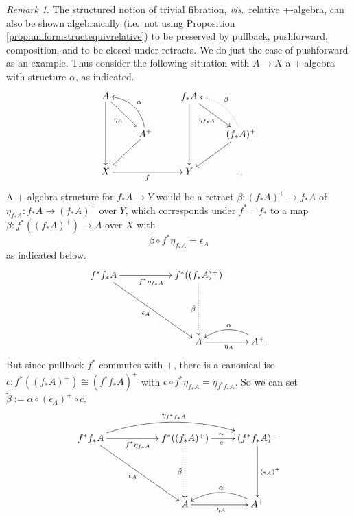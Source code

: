 \documentclass[11pt]{amsart}
\renewcommand{\to}{\ensuremath{\rightarrow}}
\theoremstyle{remark}
\newtheorem{remark}[theorem]{Remark}
\theoremstyle{definition}
\begin{document}
\begin{remark}\label{trivfibpushforward}
The structured notion of trivial fibration, \emph{vis}.\ relative +-algebra, can also be shown algebraically (i.e.\ not using Proposition \ref{prop:uniformstructequivrelative}) to be preserved by pullback, pushforward, composition, and to be closed under retracts. We do just the case of pushforward as an example.   
Thus consider the following situation with $A\to X$ a +-algebra with structure $\alpha$, as indicated.
\begin{equation}\label{diagram:pushforwardplusalgebras}
\xymatrix{
A \ar[rd]_{\eta_A} \ar[dd]  && f_*A \ar[rd]_{\eta_{f_*A}} \ar[dd] & \\
& A^+ \ar[ld] \ar@/_3ex/ [ul]_\alpha && (f_*A)^+ \ar[ld]  \ar@{.>}@/_3ex/ [ul]_\beta \\
X \ar[rr]_{f} && Y &,
}
\end{equation}
A +-algebra structure for $f_*A \to Y$ would be a retract $\beta : (f_*A)^+ \to f_*A$ of $\eta_{f_*A} : f_*A \to (f_*A)^+$ over $Y$, which corresponds under $f^*\dashv f_*$ to a map $\tilde\beta : f^*((f_*A)^+) \to A$ over $X$ with $$\tilde\beta \circ f^*\eta_{f_*A} = \epsilon_A$$
as indicated below.
\begin{equation}\label{diagram:pushforwardplusalgebras2}
\xymatrix{
f^*f_*A \ar[rrdd]_{\epsilon_A} \ar[rr]_{f^*\eta_{f_*A}} 
	&&  f^*((f_*A)^+)  \ar@{.>}[dd]_{\tilde\beta} \\
&&\\
&& A \ar[r]_{\eta_A} & \ar@/_3ex/ [l]_\alpha A^+ .
}
\end{equation}
But since pullback $f^*$ commutes with $+$, there is a canonical iso $c : f^*((f_*A)^+)  \cong (f^*f_*A)^+$ with $ c\circ f^*\eta_{f_*A} = \eta_{f^*f_*A} $. So we can set $\tilde\beta := \alpha\circ(\epsilon_A)^+\circ c$.
\begin{equation}\label{diagram:pushforwardplusalgebras3}
\xymatrix{
f^*f_*A \ar[rrdd]_{\epsilon_A} \ar[rr]_{f^*\eta_{f_*A}}  \ar@/^4ex/ [rrr]^{\eta_{f^*f_*A}} 
	&&  f^*((f_*A)^+)  \ar@{.>}[dd]_{\tilde\beta} \ar[r]^{\sim}_{c}  & (f^*f_*A)^+  \ar[dd]^{(\epsilon_A)^+} \\
&&&\\
&& A \ar[r]_{\eta_{A}} & \ar@/_3ex/ [l]_\alpha A^+ 
}
\end{equation}
\end{remark}
\end{document}
